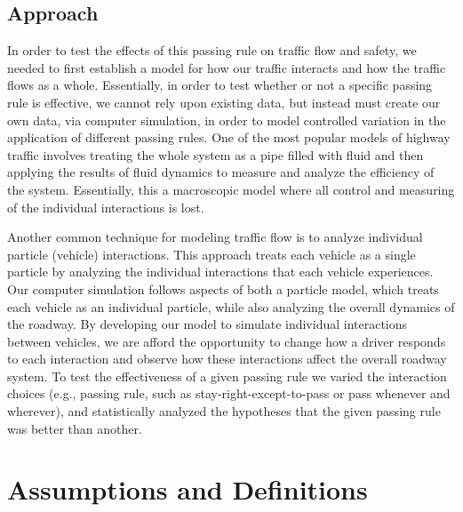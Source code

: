 \documentclass{amsart}
\begin{document}
	\subsection{Approach}
		In order to test the effects of this passing rule on traffic flow and safety, we needed to first establish a model for how our traffic interacts and how the traffic flows as a whole. Essentially, in order to test whether or not a specific passing rule is effective, we cannot rely upon existing data, but instead must create our own data, via computer simulation, in order to model controlled variation in the application of different passing rules. One of the most popular models of highway traffic involves treating the whole system as a pipe filled with fluid and then applying the results of fluid dynamics to measure and analyze the efficiency of the system. Essentially, this a macroscopic model where all control and measuring of the individual interactions is lost.
		
		Another common technique for modeling traffic flow is to analyze individual particle (vehicle) interactions. This approach treats each vehicle as a single particle by analyzing the individual interactions that each vehicle experiences. Our computer simulation follows aspects of both a particle model, which treats each vehicle as an individual particle, while also analyzing the overall dynamics of the roadway. By developing our model to simulate individual interactions between vehicles, we are afford the opportunity to change how a driver responds to each interaction and observe how these interactions affect the overall roadway system. To test the effectiveness of a given passing rule we varied the interaction choices (e.g., passing rule, such as stay-right-except-to-pass or pass whenever and wherever), and  statistically analyzed the hypotheses that the given passing rule was better than another. 

\section{\bfseries{Assumptions and Definitions}}
\end{document}
